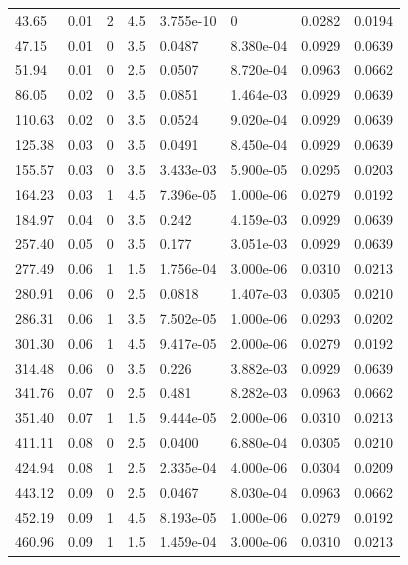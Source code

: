 \documentclass[preview]{standalone}
\begin{document}
{{\begin{tabular}{L{1.2cm}C{1.2cm} C{0.3cm}C{0.5cm} C{1.4cm}C{1.4cm} C{1.4cm}C{1.4cm}}
  43.65  &  0.01  & 2     & 4.5 &  3.755e-10  & 0  & 0.0282 &  0.0194   \\ 
  47.15  &  0.01  & 0     & 3.5 &  0.0487  & 8.380e-04  & 0.0929 &  0.0639   \\ 
  51.94  &  0.01  & 0     & 2.5 &  0.0507  & 8.720e-04  & 0.0963 &  0.0662   \\ 
  86.05  &  0.02  & 0     & 3.5 &  0.0851  & 1.464e-03  & 0.0929 &  0.0639   \\ 
  110.63  &  0.02  & 0     & 3.5 &  0.0524  & 9.020e-04  & 0.0929 &  0.0639   \\ 
  125.38  &  0.03  & 0     & 3.5 &  0.0491  & 8.450e-04  & 0.0929 &  0.0639   \\ 
  155.57  &  0.03  & 0     & 3.5 &  3.433e-03  & 5.900e-05  & 0.0295 &  0.0203   \\ 
  164.23  &  0.03  & 1     & 4.5 &  7.396e-05  & 1.000e-06  & 0.0279 &  0.0192   \\ 
  184.97  &  0.04  & 0     & 3.5 &  0.242  & 4.159e-03  & 0.0929 &  0.0639   \\ 
  257.40  &  0.05  & 0     & 3.5 &  0.177  & 3.051e-03  & 0.0929 &  0.0639   \\ 
  277.49  &  0.06  & 1     & 1.5 &  1.756e-04  & 3.000e-06  & 0.0310 &  0.0213   \\ 
  280.91  &  0.06  & 0     & 2.5 &  0.0818  & 1.407e-03  & 0.0305 &  0.0210   \\ 
  286.31  &  0.06  & 1     & 3.5 &  7.502e-05  & 1.000e-06  & 0.0293 &  0.0202   \\ 
  301.30  &  0.06  & 1     & 4.5 &  9.417e-05  & 2.000e-06  & 0.0279 &  0.0192   \\ 
  314.48  &  0.06  & 0     & 3.5 &  0.226  & 3.882e-03  & 0.0929 &  0.0639   \\ 
  341.76  &  0.07  & 0     & 2.5 &  0.481  & 8.282e-03  & 0.0963 &  0.0662   \\ 
  351.40  &  0.07  & 1     & 1.5 &  9.444e-05  & 2.000e-06  & 0.0310 &  0.0213   \\ 
  411.11  &  0.08  & 0     & 2.5 &  0.0400  & 6.880e-04  & 0.0305 &  0.0210   \\ 
  424.94  &  0.08  & 1     & 2.5 &  2.335e-04  & 4.000e-06  & 0.0304 &  0.0209   \\ 
  443.12  &  0.09  & 0     & 2.5 &  0.0467  & 8.030e-04  & 0.0963 &  0.0662   \\ 
  452.19  &  0.09  & 1     & 4.5 &  8.193e-05  & 1.000e-06  & 0.0279 &  0.0192   \\ 
  460.96  &  0.09  & 1     & 1.5 &  1.459e-04  & 3.000e-06  & 0.0310 &  0.0213   \\ 

\end{tabular}}}
\end{document}
